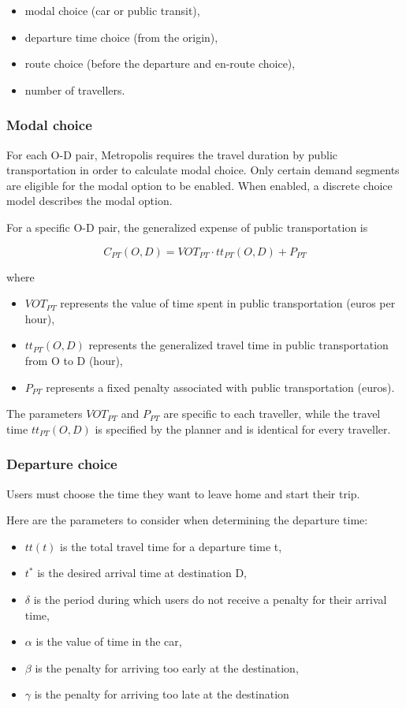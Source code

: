 \documentclass[a4paper, 12pt,oneside]{article}
\begin{document}
\begin{itemize}
    \item modal choice (car or public transit),
    \item departure time choice (from the origin),
    \item route choice (before the departure and en-route choice),
    \item number of travellers.
\end{itemize}
\subsubsection{Modal choice}
For each O-D pair, Metropolis requires the travel duration by public transportation in order to calculate modal choice. Only certain demand segments are eligible for the modal option to be enabled. When enabled, a discrete choice model describes the modal option.

For a specific O-D pair, the generalized expense of public transportation is

\begin{equation}
    C_{PT}(O,D)=VOT_{PT}\cdot tt_{PT}(O,D)+P_{PT}
\end{equation}

where

\begin{itemize}
    \item $VOT_{PT}$ represents the value of time spent in public transportation (euros per hour),
    \item $tt_{PT}(O,D)$ represents the generalized travel time in public transportation from O to D (hour),
    \item $P_{PT}$ represents a fixed penalty associated with public transportation (euros).
\end{itemize}
The parameters $VOT_{PT}$ and $P_{PT}$ are specific to each traveller, while the travel time $tt_{PT}(O,D)$ is specified by the planner and is identical for every traveller.
\subsubsection{Departure choice}

Users must choose the time they want to leave home and start their trip.

Here are the parameters to consider when determining the departure time:

\begin{itemize}
    \item $tt(t)$ is the total travel time for a departure time t,
    \item $t^{*}$ is the desired arrival time at destination D,
    \item $\delta$ is the period during which users do not receive a penalty for their arrival time,
    \item $\alpha$ is the value of time in the car,
    \item $\beta$ is the penalty for arriving too early at the destination,
    \item $\gamma$ is the penalty for arriving too late at the destination
\end{itemize}
\end{document}
